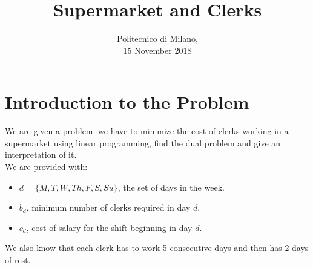 \documentclass[1pt]{article}
\title{\huge \textrm{Supermarket and Clerks}}
\date{\textrm{Politecnico di Milano, \\15 November 2018}}
\begin{document}
	\begin{titlepage}
		\maketitle
	\end{titlepage}


	\newpage
	\section{Introduction to the Problem}
		We are given a problem: we have to minimize the cost of clerks working in a supermarket using linear programming, find the dual problem and give an interpretation of it.\\
		We are provided with: 
		\begin{itemize}
			\item $d = \{M, T, W, Th, F, S, Su\}$, the set of days in the week. 
			\item $b_d$, minimum number of clerks required in day $d$.
			\item $c_d$, cost of salary for the shift beginning in day $d$.
		\end{itemize}
		We also know that each clerk has to work 5 consecutive days and then has 2 days of rest.
\end{document}
